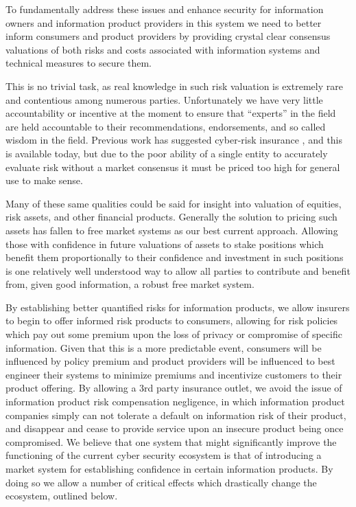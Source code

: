 \documentclass[conference]{IEEEtran}
\begin{document}
To fundamentally address these issues and enhance security for information owners and information product providers in this system we need to better inform consumers and product providers by providing crystal clear consensus valuations of both risks and costs associated with information systems and technical measures to secure them.

This is no trivial task, as real knowledge in such risk valuation is extremely rare and contentious among numerous parties.   Unfortunately we have very little accountability or incentive at the moment to ensure that “experts” in the field are held accountable to their recommendations, endorsements, and so called wisdom in the field.  Previous work has suggested cyber-risk insurance \cite{gordon2003framework} \cite{mukhopadhyay2005insurance}, and this is available today, but due to the poor ability of a single entity to accurately evaluate risk without a market consensus it must be priced too high for general use to make sense. \cite{briys1991reliability}

Many of these same qualities could be said for insight into valuation of equities, risk assets, and other financial products.   Generally the solution to pricing such assets has fallen to free market systems as our best current approach.   Allowing those with confidence in future valuations of assets to stake positions which benefit them proportionally to their confidence and investment in such positions is one relatively well understood way to allow all parties to contribute and benefit from, given good information, a robust free market system.

By establishing better quantified risks for information products, we allow insurers to begin to offer informed risk products to consumers, allowing for risk policies which pay out some premium upon the loss of privacy or compromise of specific information.   Given that this is a more predictable event, consumers will be influenced by policy premium and product providers will be influenced to best engineer their systems to minimize premiums and incentivize customers to their product offering.   By allowing a 3rd party insurance outlet, we avoid the issue of information product risk compensation negligence, in which information product companies simply can not tolerate a default on information risk of their product, and disappear and cease to provide service upon an insecure product being once compromised.
We believe that one system that might significantly improve the functioning of the current cyber security ecosystem is that of introducing a market system for establishing confidence in certain information products.   By doing so we allow a number of critical effects which drastically change the ecosystem, outlined below.
\end{document}
